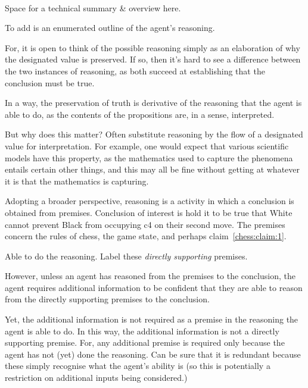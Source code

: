 \documentclass[10pt]{article}
\newcommand{\hozlinedash}[0]{%
  \noindent\hdashrule[0.5ex][c]{\textwidth}{.1pt}{2.5pt}
}
\begin{document}
\hozlinedash

\paragraph{ }
\begin{note}
  Space for a technical summary \& overview here.

  To add is an enumerated outline of the agent's reasoning.
\end{note}

{
  \begin{note}[Important]
    For, it is open to think of the possible reasoning simply as an elaboration of why the designated value is preserved.
    If so, then it's hard to see a difference between the two instances of reasoning, as both succeed at establishing that the conclusion must be true.

    In a way, the preservation of truth is derivative of the reasoning that the agent is able to do, as the contents of the propositions are, in a sense, interpreted.
  \end{note}

  But why does this matter?
  Often substitute reasoning by the flow of a designated value for interpretation.
  For example, one would expect that various scientific models have this property, as the mathematics used to capture the phenomena entails certain other things, and this may all be fine without getting at whatever it is that the mathematics is capturing.
}

Adopting a broader perspective, reasoning is a activity in which a conclusion is obtained from premises.
Conclusion of interest is hold it to be true that White cannot prevent Black from occupying c4 on their second move.
The premises concern the rules of chess, the game state, and perhaps claim~\ref{chess:claim:1}.

Able to do the reasoning.
Label these \emph{directly supporting} premises.

However, unless an agent has reasoned from the premises to the conclusion, the agent requires additional information to be confident that they are able to reason from the directly supporting premises to the conclusion.

Yet, the additional information is not required as a premise in the reasoning the agent is able to do.
In this way, the additional information is not a directly supporting premise.
For, any additional premise is required only because the agent has not (yet) done the reasoning.
Can be sure that it is redundant because these simply recognise what the agent's ability is (so this is potentially a restriction on additional inputs being considered.)
\end{document}
